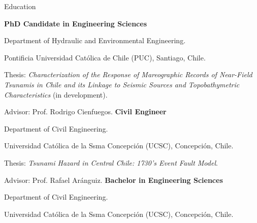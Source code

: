 \begin{rubric}{Education}

\entry*[Since  2015]%
	\textbf{PhD Candidate in Engineering Sciences} 
	\par Department of Hydraulic and Environmental Engineering.
	 \par Pontificia Universidad Cat\'olica de Chile (PUC), Santiago, Chile.
	 \par Thesis: \emph{Characterization of the Response of Mareographic Records of Near-Field Tsunamis in Chile and its Linkage to Seismic Sources and Topobathymetric Characteristics} (in development).
	 \par Advisor: Prof. Rodrigo Cienfuegos.
%
\entry*[2008 -- 2015]%
	\textbf{Civil Engineer}
	\par Department of Civil Engineering. 
	 \par Universidad Cat\'olica de la Ssma Concepci\'on (UCSC), Concepci\'on, Chile.
	 \par Thesis: \emph{Tsunami Hazard in Central Chile: 1730's Event Fault Model}.
	 \par Advisor: Prof. Rafael Ar\'anguiz.
%
\entry*[2008 -- 2012]%
	\textbf{Bachelor in Engineering Sciences}
	\par Department of Civil Engineering. 
	\par Universidad Cat\'olica de la Ssma Concepci\'on (UCSC), Concepci\'on, Chile. %
\end{rubric}